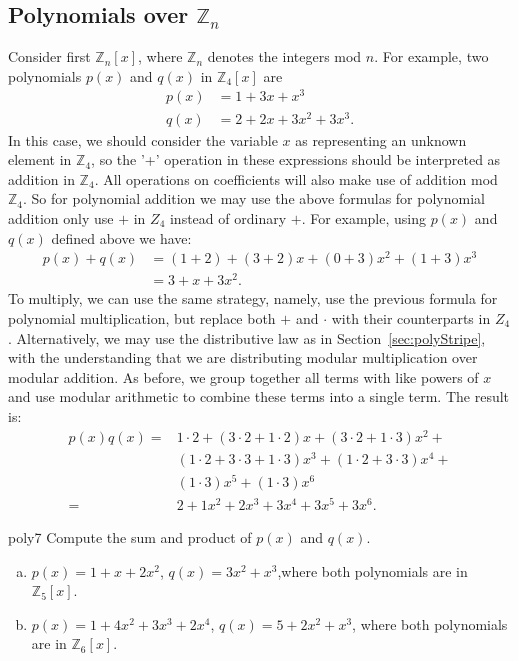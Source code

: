 \subsection*{Polynomials over $\mathbb{Z}_n$}
Consider first $\mathbb{Z}_n[x]$, where $\mathbb{Z}_n$ denotes the integers mod $n$. For example, two polynomials $p(x)$ and $q(x)$ in $\mathbb{Z}_4[x]$ are
\begin{align*} 
p(x) & = 1+3x+x^3\\
q(x) & = 2+2x+3x^2+3x^3.
\end{align*}
In this case, we should consider the variable $x$ as representing an unknown element in $\mathbb{Z}_4$, so the '+' operation in these expressions should be interpreted as addition in $\mathbb{Z}_4$. All operations on coefficients will also make use of addition mod $\mathbb{Z}_4$. So for polynomial addition we may use the above formulas for polynomial addition only use $+$ in $Z_4$ instead of ordinary $+$. For example, using $p(x)$ and $q(x)$ defined above we have: 
\begin{align*}
p(x) + q(x) &=(1+ 2)+(3+ 2)x+(0+ 3)x^2+ (1+ 3)x^3\\
&= 3+x+3x^2.
\end{align*}
To multiply, we can use the same strategy, namely, use the previous formula for polynomial multiplication, but replace both $+$ and $\cdot$ with their counterparts in $Z_4$. Alternatively,  we may use the distributive law as in Section~\ref{sec:polyStripe}, with the understanding that we are distributing modular multiplication over modular addition. As before, we group together all terms with like powers of $x$ and use modular arithmetic to combine  these terms into a single term.  The result is:
\begin{align*}
p(x)  q(x)  =  &1\cdot 2+(3 \cdot 2 + 1 \cdot 2)x+(3 \cdot 2 +  1 \cdot 3)x^2+\\
&(1\cdot 2 + 3\cdot 3 +  1 \cdot 3)x^3+ (1\cdot 2 +  3\cdot 3)x^4 +\\
&(1 \cdot 3)x^5+ (1 \cdot 3)x^6\\
= &2+1x^2 + 2x^3+ 3x^4+ 3x^5+3x^6.
\end{align*}

\begin{exercise}{poly7}
Compute the sum and product of $p(x)$ and $q(x)$.
\begin{enumerate}[(a)]
\item
$p(x)=1+x+2x^2$, $q(x)=3x^2+x^3$,where both polynomials are in $\mathbb{Z}_5[x]$.
\item
$p(x)= 1+4x^2+3x^3+2x^4$, $q(x)=5+2x^2+x^3$, where both polynomials are in $\mathbb{Z}_6[x]$.
\end{enumerate}
\end{exercise}

